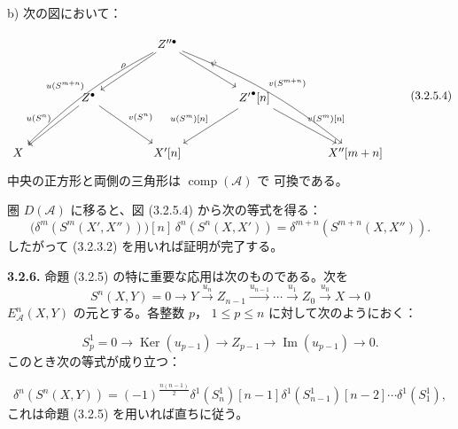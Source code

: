 \clearpage
{}%
\begingroup\small\setlength{\parskip}{0pt}\setlength{\emergencystretch}{1.5em}
\setlength{\abovedisplayskip}{4pt plus 2pt minus 2pt}%
\setlength{\belowdisplayskip}{4pt plus 2pt minus 2pt}%

\noindent b) 次の図において：

\begin{equation}
\resizebox{0.96\textwidth}{!}{%
$\begin{tikzcd}[ampersand replacement=\&,column sep=4.1em,row sep=3.0em]
\&\& Z''^\bullet
  \arrow[ddll,bend right=8,"{u(S^{m+n})}"']
  \arrow[dl,"\rho"']
  \arrow[dr,"\psi"]
  \arrow[ddrr,bend left=8,"{v(S^{m+n})}"]
\&\& \\
\& Z^\bullet
  \arrow[dl,"{u(S^n)}"']
  \arrow[dr,"{v(S^n)}"]
\&\& {Z'}^\bullet[n]
  \arrow[dl,"{u(S^m)[n]}"']
  \arrow[dr,"{v(S^m)[n]}"]
\& \\
X \&\& X'[n] \&\& X''[m+n]
\end{tikzcd}$%
}
\tag{3.2.5.4}
\end{equation}
中央の正方形と両側の三角形は $\operatorname{comp}(\mathcal A)$ で
可換である。

圏 $D(\mathcal A)$ に移ると、図 (3.2.5.4) から次の等式を得る：
\[
\bigl(\delta^m(S^m(X',X''))\bigr)[n]\,
\delta^n(S^n(X,X'))
=\delta^{m+n}(S^{m+n}(X,X'')).
\]
したがって (3.2.3.2) を用いれば証明が完了する。

\medskip\noindent\textbf{3.2.6.}\quad
命題 (3.2.5) の特に重要な応用は次のものである。次を
\[
S^n(X,Y)=0\longrightarrow Y\xrightarrow{u_n}Z_{n-1}
\xrightarrow{u_{n-1}}\cdots\xrightarrow{u_1}Z_0
\xrightarrow{u_0}X\longrightarrow0
\]
$E_{\mathcal A}^{n}(X,Y)$ の元とする。各整数 $p$，
$1\leq p\leq n$ に対して次のようにおく：

\begin{equation}
S_p^1=0\longrightarrow\operatorname{Ker}(u_{p-1})
\longrightarrow Z_{p-1}\longrightarrow\operatorname{Im}(u_{p-1})
\longrightarrow0.
\tag{3.2.6.1}
\end{equation}
このとき次の等式が成り立つ：

\begin{equation}
\delta^n(S^n(X,Y))=(-1)^{\frac{n(n-1)}2}
\delta^1(S_n^1)[n-1]\delta^1(S_{n-1}^1)[n-2]\cdots
\delta^1(S_1^1),
\tag{3.2.6.2}
\end{equation}
これは命題 (3.2.5) を用いれば直ちに従う。

